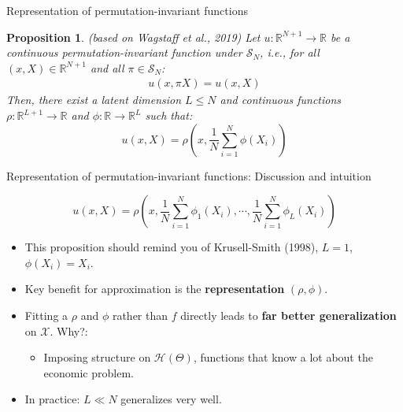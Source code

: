 \documentclass[aspectratio=169,10pt]{beamer}
\newcommand{\emphcolor}[1]{\textbf{\textcolor{emphcolorval}{#1}}}
\newtheorem{proposition}{Proposition}
\newcommand{\Xdom}{\mathcal{X}}
\begin{document}
\begin{frame}{Representation of permutation-invariant functions }
		
			\begin{proposition}{ (based on Wagstaff et al., 2019)}
				Let  $u:\mathbb{R}^{N+1} \rightarrow \mathbb{R}$ be a continuous permutation-invariant function under $\mathcal{S}_N$, i.e., for all $(x,X) \in \mathbb{R}^{N+1}$ and all $\pi \in \mathcal{S}_N$:
				\begin{align*}
					u(x, \pi X) = u(x,X)
				\end{align*}
				Then, there exist a latent dimension $L\leq N$ and continuous functions $\rho : \mathbb{R}^{L+1}\rightarrow \mathbb{R}$ and $\phi: \mathbb{R} \rightarrow \mathbb{R}^L$ such that:
				\begin{equation*}
					u(x,X) = \rho \left(x,\frac{1}{N}\sum_{i=1}^N\phi(X_i)\right)
				\end{equation*}
				\vspace{-0.1in}
			\end{proposition}
		\end{frame}
	
	
	\begin{frame}[label = symmetry]{Representation of permutation-invariant functions: Discussion and intuition}
		
		
		$$u(x,X) = \rho\left(x,\frac{1}{N} \sum_{i=1}^N\phi_1(X_i),\cdots, \frac{1}{N} \sum_{i=1}^N\phi_L(X_i)\right)$$
			\begin{itemize}
				\item This proposition should remind you of Krusell-Smith (1998), $L =1$, $\phi(X_i) = X_i$. \vspace{0.1 in}
				\item Key benefit for approximation is the \emphcolor{representation} $(\rho,\phi)$.
				\smallskip
				\item Fitting a $\rho$ and $\phi$ rather than $f$ directly leads to \emphcolor{far better generalization} on $\Xdom$. Why?:\vspace{0.1 in}
				\smallskip
				\begin{itemize}
					\item Imposing structure on $\mathcal{H}(\Theta)$, functions that know a lot about the economic problem.\vspace{0.1 in}
				\end{itemize}
				\item In practice: $L\ll N$  generalizes very well. \hyperlink{Reg-example}{}
			\end{itemize}
	
	\end{frame}
\end{document}

